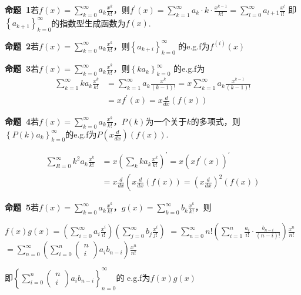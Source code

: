 \documentclass{report}
\begin{document}
\textbf{命题\ 1}若$f(x)=\sum_{k=0}^{\infty} a_{k} \frac{x^{k}}{k !}$，则$f^{\prime}(x)=\sum_{k=1}^{\infty} a_{k} \cdot k \cdot \frac{x^{k-1}}{k !}=\sum_{l=0}^{\infty} a_{l+1} \frac{x^{l}}{l !}$
即$\left\{a_{k+1}\right\}_{k=0}^{\infty}$的指数型生成函数为$f(x)$.

\textbf{命题\ 2}若$f(x)=\sum_{k=0}^{\infty} a_{k} \frac{x^{k}}{k !}$，则$\left\{a_{k+i}\right\}_{k=0}^{\infty}$
的e.g.f为$f^{ (i) }(x)$

\textbf{命题\ 3}若$f(x)=\sum_{k=0}^{\infty} a_{k} \frac{x^{k}}{k !}$，则$\left\{ka_{k}\right\}_{k=0}^{\infty}$
的e.g.f为
$$
\begin{aligned}
\sum_{k=1}^{\infty} k a_{k} \frac{x^{k}}{k !} &=\sum_{k=1}^{\infty} a_{k} \frac{x^{k}}{(k-1) !}=x \sum_{k=1}^{\infty} a_{k} \frac{x^{k-1}}{(k-1) !} \\
&=x f^{\prime}(x)=x \frac{d}{d x}(f(x))
\end{aligned}
$$

\textbf{命题\ 4}若$f(x)=\sum_{k=0}^{\infty} a_{k} \frac{x^{k}}{k !}$，$P(k)$为一个关于$k$的多项式，则
$\left\{P(k)a_{k}\right\}_{k=0}^{\infty}$的e.g.f为$P\left(x \frac{d}{d x}\right)(f(x))$.

$$
\begin{aligned}
\sum_{R=0}^{\infty} k^{2} a_{k} \frac{x^{k}}{k !} &=x\left(\sum_{k} k a_{k} \frac{x^{k}}{k !}\right)^{\prime}=x\left(x f^{\prime}(x)\right)^{\prime} \\
&=x \frac{d}{d x}\left(x \frac{d}{d x}(f(x))=\left(x \frac{d}{d x}\right)^{2}(f(x))\right.
\end{aligned}
$$

\textbf{命题\ 5}若$f(x)=\sum_{k=0}^{\infty} a_{k} \frac{x^{k}}{k !}$，$g(x)=\sum_{k=0}^{\infty} b_{k} \frac{x^{k}}{k !}$，则

$f(x) g(x)=\left(\sum_{i=0}^{\infty} a_{i} \frac{x^{i}}{i !}\right)\left(\sum_{j=0}^{\infty} b_{j} \frac{x^{i}}{j !}\right)$
$=\sum_{n=0}^{\infty} n !\left(\sum_{i=1}^{n} \frac{a_{i}}{i !} \cdot \frac{b_{n-i}}{(n-i) !}\right) \frac{x^{n}}{n !}$
$=\sum_{n=0}^{\infty}\left(\sum_{i=0}^{n}\left(\begin{array}{l}n \\ i\end{array}\right) a_{i} b_{n-i}\right) \frac{x^{n}}{n !}$

即$\left\{\sum_{i=0}^{n}\left(\begin{array}{l}n \\ i\end{array}\right) a_{i}b_{n-i} \right\}_{n=0}^{\infty}$的
e.g.f为$f(x)g(x)$
\end{document}
